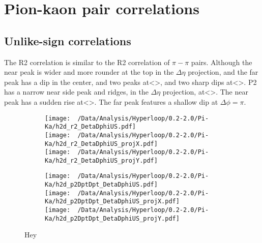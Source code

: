 \documentclass[12pt,a4paper,twoside]{report}
\begin{document}
\section{Pion-kaon pair correlations}
\subsection{Unlike-sign correlations}
The R2 correlation is similar to the R2 correlation of $\pi-\pi$ pairs. Although the near peak is wider and more rounder at the top in the $\Delta\eta$ projection, and the far peak has a dip in the center, and two peaks at<>, and two sharp dips at<>. P2 has a narrow near side peak and ridges, in the $\Delta\eta$ projection, at<>. The near peak has a sudden rise at<>. The far peak features a shallow dip at $\Delta\phi=\pi$.
\begin{figure}[H]
	\begin{subfigure}{0.49\linewidth}
		\texttt{[image: ~/Data/Analysis/Hyperloop/0.2-2.0/Pi-Ka/h2d\_r2\_DetaDphiUS.pdf]}\\
		\texttt{[image: ~/Data/Analysis/Hyperloop/0.2-2.0/Pi-Ka/h2d\_r2\_DetaDphiUS\_projX.pdf]}\\
		\texttt{[image: ~/Data/Analysis/Hyperloop/0.2-2.0/Pi-Ka/h2d\_r2\_DetaDphiUS\_projY.pdf]}\\
	\end{subfigure}
	\begin{subfigure}{0.49\linewidth}
		\texttt{[image: ~/Data/Analysis/Hyperloop/0.2-2.0/Pi-Ka/h2d\_p2DptDpt\_DetaDphiUS.pdf]}\\
		\texttt{[image: ~/Data/Analysis/Hyperloop/0.2-2.0/Pi-Ka/h2d\_p2DptDpt\_DetaDphiUS\_projX.pdf]}\\
		\texttt{[image: ~/Data/Analysis/Hyperloop/0.2-2.0/Pi-Ka/h2d\_p2DptDpt\_DetaDphiUS\_projY.pdf]}\\
	\end{subfigure}
	\caption{Hey}
\end{figure}
\end{document}
